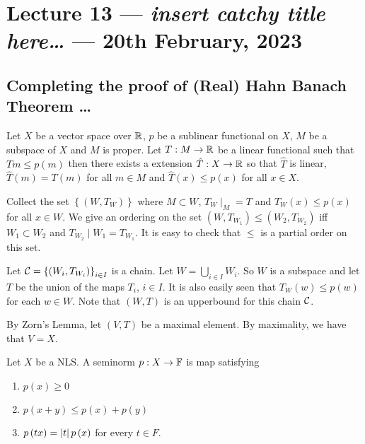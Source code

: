 \section{Lecture 13 --- \emph{insert catchy title here\ldots} --- 20th February, 2023}
\horz
\subsection{Completing the proof of (Real) Hahn Banach Theorem \ldots}
\begin{theorem}
Let $X$ be a vector space over $\mathbb R$, $p$ be a sublinear functional on $X$,  $M$ be a subspace of $X$ and $M$ is proper. Let $T: M \to \mathbb R$ be a linear functional such that $Tm \le p (m)$ then there exists a extension $\hat{T} : X \to \mathbb R$ so that $\hat{T}$ is linear, $\hat{T} (m) = T(m)$ for all $m\in M$ and $\hat{T}(x) \le p (x) $ for all $x\in X$.
\end{theorem}

Collect the set $\left\{ \left( W, T_{W} \right) \right\}$ where $M \subset W$, $T_{W} \mid _{M} = T$ and $T_{W}(x) \le p(x)$ for all $x\in W$. We give an ordering on the set $\left( W, T_{W_{1}} \right) \le \left( W_{2} , T_{W_{2}} \right)$ iff $W_{1} \subset W_{2}$ and $T_{W_{2}} \mid W_{1} = T_{W_{1}}$. It is easy to check that $\le$ is a partial order on this set.

Let ${\cal C} = \left\{ \left( W_{i}, T_{W_{i}} \right) \right\}_{i\in I}$ is a chain. Let $W= \bigcup_{i \in I} W_{i}$. So $W$ is a subspace and let $T$ be the union of the maps $T_{i}$, $i\in I$. It is also easily seen that $T_{W} \left( w \right) \le p \left( w \right)$ for each $w \in W$. Note that $\left( W, T \right)$ is an upperbound for this chain ${\cal C}$. 

By Zorn's Lemma, let $\left( V, T \right)$ be a maximal element. By maximality, we have that $V=X$.


\begin{definition}
    Let $X$ be a NLS. A seminorm $p: X \to \mathbb F$ is map satisfying
    \begin{enumerate}
	\item $p\left( x \right) \ge 0$
	\item $p\left( x+y \right) \le p\left( x \right) + p \left( y \right)$
	\item $p\left( tx \right) = \left\lvert t \right\rvert p\left( x \right)$ for every $t\in F$.
    \end{enumerate}
    \label{def:semi-norm}
\end{definition}

